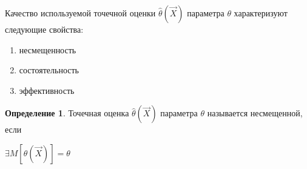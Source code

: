 \documentclass[a4paper, 12pt]{article}
\theoremstyle{definition}
\newtheorem{definition}{Определение}[section]
\theoremstyle{leads}
\theoremstyle{example}
\begin{document}
Качество используемой точечной оценки $\hat{\theta}(\vec{X})$ параметра $\theta$ характеризуют следующие свойства:
\begin{enumerate}
	\item несмещенность
	\item состоятельность 
	\item эффективность
\end{enumerate}

\begin{definition}
	Точечная оценка $\hat{\theta}(\vec{X})$ параметра $\theta$ называется несмещенной, если 
	\begin{center}
		\centering $\exists M[\hat{\theta}(\vec{X})] = \theta$
	\end{center}
\end{definition}
\end{document}
